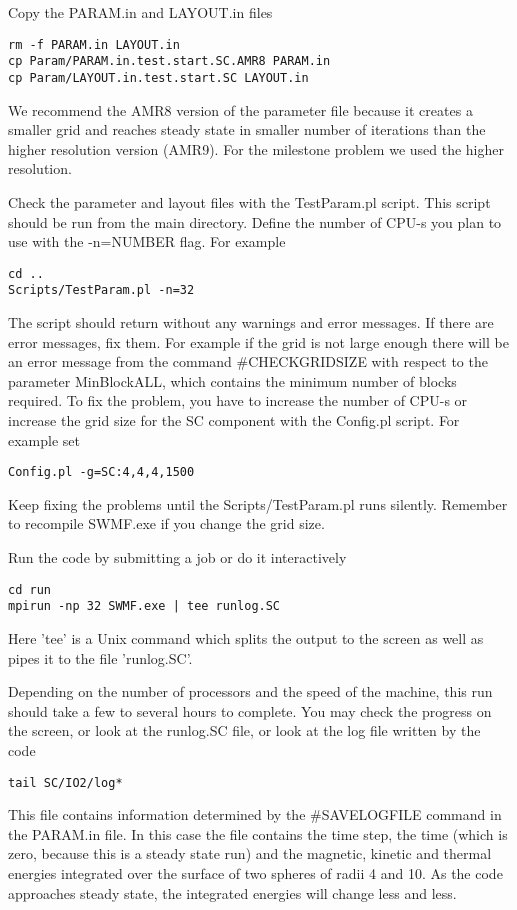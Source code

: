 Copy the PARAM.in and LAYOUT.in files
\begin{verbatim}
rm -f PARAM.in LAYOUT.in
cp Param/PARAM.in.test.start.SC.AMR8 PARAM.in
cp Param/LAYOUT.in.test.start.SC LAYOUT.in
\end{verbatim}
We recommend the AMR8 version of the parameter file because it creates
a smaller grid and reaches steady state in smaller number of iterations
than the higher resolution version (AMR9). For the milestone problem
we used the higher resolution.

Check the parameter and layout files with the TestParam.pl script. 
This script should be run from the main directory.
Define the number of CPU-s you plan to use with the -n=NUMBER flag.
For example
\begin{verbatim}
cd ..
Scripts/TestParam.pl -n=32
\end{verbatim}
The script should return without any warnings and error messages.
If there are error messages, fix them. 
For example if the grid is not large enough there will be an 
error message from the command \#CHECKGRIDSIZE with respect
to the parameter  MinBlockALL, which contains the minimum number
of blocks required. To fix the problem, you have to increase the number 
of CPU-s or increase the grid size for the SC component with the 
Config.pl script. For example set
\begin{verbatim}
Config.pl -g=SC:4,4,4,1500
\end{verbatim}
Keep fixing the problems until the Scripts/TestParam.pl runs silently.
Remember to recompile SWMF.exe if you change the grid size.

Run the code by submitting a job or do it interactively
\begin{verbatim}
cd run
mpirun -np 32 SWMF.exe | tee runlog.SC
\end{verbatim}
Here 'tee' is a Unix command which splits the output to the screen as
well as pipes it to the file 'runlog.SC'. 

Depending on the number of processors and the speed of the machine,
this run should take a few to several hours to complete.
You may check the progress on the screen, or look at the 
runlog.SC file, or look at the log file written by the code
\begin{verbatim}
tail SC/IO2/log*
\end{verbatim}
This file contains information determined by the \#SAVELOGFILE command
in the PARAM.in file. In this case the file contains the time step, the
time (which is zero, because this is a steady state run) and the
magnetic, kinetic and thermal energies integrated over the surface of 
two spheres of radii 4 and 10. As the code approaches steady state,
the integrated energies will change less and less. 

